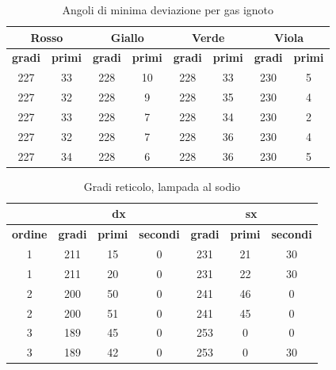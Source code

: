 \documentclass[letterpaper,12pt]{article}
\begin{document}
    \begin{table}[h!]
        \centering
        \begin{tabular}{|c|c|c|c|c|c|c|c|}
        \hline
        \multicolumn{2}{|c|}{\textbf{Rosso}} & \multicolumn{2}{|c|}{\textbf{Giallo}} & \multicolumn{2}{|c|}{\textbf{Verde}} & \multicolumn{2}{|c|}{\textbf{Viola}} \\
        \hline
        \textbf{gradi} & \textbf{primi} & \textbf{gradi} & \textbf{primi} & \textbf{gradi} & \textbf{primi} & \textbf{gradi} & \textbf{primi} \\
        \hline
        227 & 33 & 228 & 10 & 228 & 33 & 230 & 5 \\
        227 & 32 & 228 & 9 & 228 & 35 & 230 & 4 \\
        227 & 33 & 228 & 7 & 228 & 34 & 230 & 2 \\
        227 & 32 & 228 & 7 & 228 & 36 & 230 & 4 \\
        227 & 34 & 228 & 6 & 228 & 36 & 230 & 5 \\
        \hline
        \end{tabular}
        \caption{Angoli di minima deviazione per gas ignoto}
        \label{tab:prisma_md_ignoto}
        \end{table}
        
        \begin{table}[h!]
            \centering
            \begin{tabular}{|c|ccc|ccc|}
            \hline
            & \multicolumn{3}{|c|}{\textbf{dx}} & \multicolumn{3}{|c|}{\textbf{sx}} \\
            \hline
            \textbf{ordine} & \textbf{gradi} & \textbf{primi} & \textbf{secondi} & \textbf{gradi} & \textbf{primi} & \textbf{secondi} \\
            \hline
            1 & 211 & 15 & 0 & 231 & 21 & 30 \\
            1 & 211 & 20 & 0 & 231 & 22 & 30 \\
            2 & 200 & 50 & 0 & 241 & 46 & 0 \\
            2 & 200 & 51 & 0 & 241 & 45 & 0 \\
            3 & 189 & 45 & 0 & 253 & 0 & 0 \\
            3 & 189 & 42 & 0 & 253 & 0 & 30 \\
            \hline
            \end{tabular}
            \caption{Gradi reticolo, lampada al sodio}
            \label{tab:dati_reticolo_sodio}
            \end{table}
\end{document}
